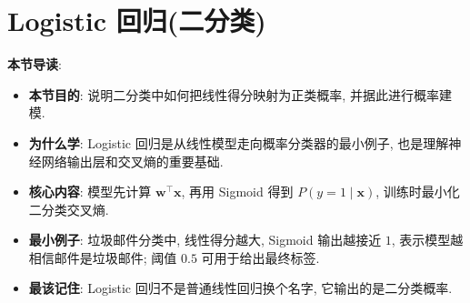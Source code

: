 \documentclass{../nndlcourse}
\begin{document}
\section{Logistic 回归(二分类)}
\textbf{本节导读}:
\begin{itemize}
    \item \textbf{本节目的}: 说明二分类中如何把线性得分映射为正类概率, 并据此进行概率建模.
    \item \textbf{为什么学}: Logistic 回归是从线性模型走向概率分类器的最小例子, 也是理解神经网络输出层和交叉熵的重要基础.
    \item \textbf{核心内容}: 模型先计算 $\boldsymbol{w}^{\top}\boldsymbol{x}$, 再用 Sigmoid 得到 $P(y=1\mid\boldsymbol{x})$, 训练时最小化二分类交叉熵.
    \item \textbf{最小例子}: 垃圾邮件分类中, 线性得分越大, Sigmoid 输出越接近 $1$, 表示模型越相信邮件是垃圾邮件; 阈值 $0.5$ 可用于给出最终标签.
    \item \textbf{最该记住}: Logistic 回归不是普通线性回归换个名字, 它输出的是二分类概率.
\end{itemize}
\end{document}
